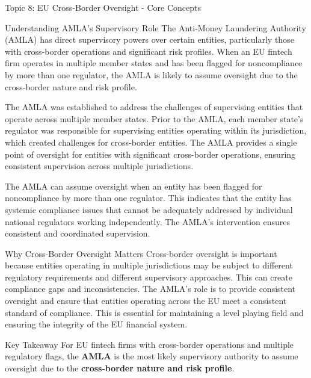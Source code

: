 \documentclass[5pt]{beamer}
\begin{document}
	\begin{frame}{Topic 8: EU Cross-Border Oversight - Core Concepts}
		\begin{block}{\tiny Understanding AMLA's Supervisory Role}
			\tiny The Anti-Money Laundering Authority (AMLA) has direct supervisory powers over certain entities, particularly those with cross-border operations and significant risk profiles. When an EU fintech firm operates in multiple member states and has been flagged for noncompliance by more than one regulator, the AMLA is likely to assume oversight due to the cross-border nature and risk profile.
			
			The AMLA was established to address the challenges of supervising entities that operate across multiple member states. Prior to the AMLA, each member state's regulator was responsible for supervising entities operating within its jurisdiction, which created challenges for cross-border entities. The AMLA provides a single point of oversight for entities with significant cross-border operations, ensuring consistent supervision across multiple jurisdictions.
			
			The AMLA can assume oversight when an entity has been flagged for noncompliance by more than one regulator. This indicates that the entity has systemic compliance issues that cannot be adequately addressed by individual national regulators working independently. The AMLA's intervention ensures consistent and coordinated supervision.
		\end{block}
		
		\begin{block}{\tiny Why Cross-Border Oversight Matters}
			\tiny Cross-border oversight is important because entities operating in multiple jurisdictions may be subject to different regulatory requirements and different supervisory approaches. This can create compliance gaps and inconsistencies. The AMLA's role is to provide consistent oversight and ensure that entities operating across the EU meet a consistent standard of compliance. This is essential for maintaining a level playing field and ensuring the integrity of the EU financial system.
		\end{block}
		
		\begin{alertblock}{Key Takeaway}
			\tiny For EU fintech firms with cross-border operations and multiple regulatory flags, the \textbf{AMLA} is the most likely supervisory authority to assume oversight due to the \textbf{cross-border nature and risk profile}.
		\end{alertblock}
	\end{frame}
	
\end{document}
